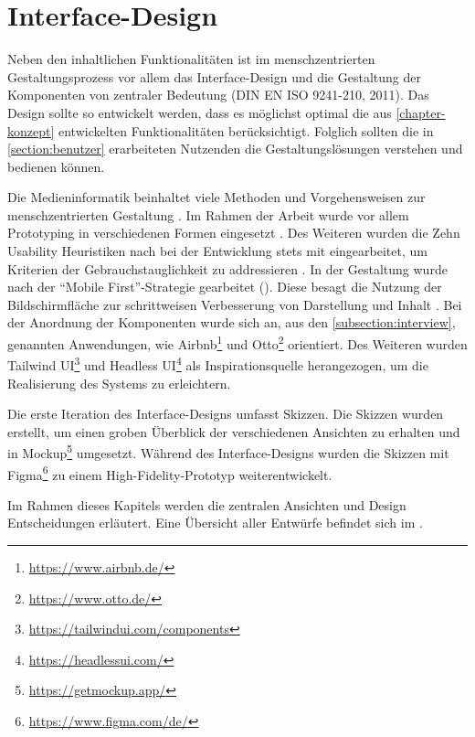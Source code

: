 \chapter{Interface-Design}
\label{chapter-design}
Neben den inhaltlichen Funktionalitäten ist im menschzentrierten Gestaltungsprozess vor allem das
Interface-Design und die Gestaltung der Komponenten von zentraler Bedeutung
\cite{DINISO9241} (DIN EN ISO 9241-210, 2011). Das Design sollte so
entwickelt werden, dass es möglichst optimal die aus \ref{chapter-konzept} entwickelten
Funktionalitäten berücksichtigt. Folglich sollten die in \ref{section:benutzer} erarbeiteten
Nutzenden die Gestaltungslösungen verstehen und bedienen können.

Die Medieninformatik beinhaltet viele Methoden und Vorgehensweisen zur menschzentrierten Gestaltung
\cite{HerczegIDE2009}. Im Rahmen der Arbeit wurde vor allem Prototyping in verschiedenen Formen
eingesetzt \cite{HerczegMDI2009}. Des Weiteren wurden die Zehn Usability Heuristiken nach
 bei der Entwicklung stets mit eingearbeitet, um Kriterien der
Gebrauchstauglichkeit zu addressieren . In
der Gestaltung wurde nach der \enquote{Mobile First}-Strategie gearbeitet (). Diese
besagt die Nutzung der Bildschirmfläche zur schrittweisen Verbesserung von Darstellung und Inhalt
\cite{kim_chapter_2013}. Bei der Anordnung der Komponenten wurde sich an, aus den \ref{subsection:interview}, genannten
Anwendungen, wie Airbnb\footnote{\url{https://www.airbnb.de/}} und
Otto\footnote{\url{https://www.otto.de/}} orientiert. Des Weiteren wurden Tailwind
UI\footnote{\url{https://tailwindui.com/components}} und Headless
UI\footnote{\url{https://headlessui.com/}} als Inspirationsquelle herangezogen, um die Realisierung
des Systems zu erleichtern.

Die erste Iteration des Interface-Designs umfasst Skizzen. Die Skizzen wurden erstellt, um einen
groben Überblick der verschiedenen Ansichten zu erhalten und in
Mockup\footnote{\url{https://getmockup.app/}} umgesetzt. Während des Interface-Designs wurden die
Skizzen mit Figma\footnote{\url{https://www.figma.com/de/}} zu einem High-Fidelity-Prototyp
weiterentwickelt.

Im Rahmen dieses Kapitels werden die zentralen Ansichten und Design Entscheidungen erläutert. Eine
Übersicht aller Entwürfe befindet sich im .

